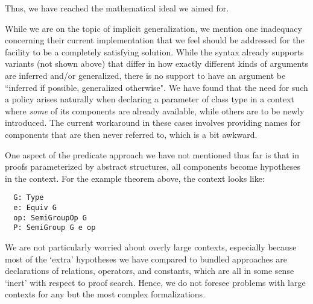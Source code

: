 \documentclass[a4paper,10pt,runningheads]{llncs}
\begin{document}
Thus, we have reached the mathematical ideal we aimed for.

While we are on the topic of implicit generalization, we mention one inadequacy concerning their current implementation that we feel should be addressed for the facility to be a completely satisfying solution. While the syntax already supports variants (not shown above) that differ in how exactly different kinds of arguments are inferred and/or generalized, there is no support to have an argument be ``inferred if possible, generalized otherwise". We have found that the need for such a policy arises naturally when declaring a parameter of class type in a context where \emph{some} of its components are already available, while others are to be newly introduced. The current workaround in these cases involves providing names for components that are then never referred to, which is a bit awkward.







One aspect of the predicate approach we have not mentioned thus far is that in proofs parameterized by abstract structures, all components become hypotheses in the context. For the example theorem above, the context looks like:
\begin{lstlisting}
  G: Type
  e: Equiv G
  op: SemiGroupOp G
  P: SemiGroup G e op
\end{lstlisting}
We are not particularly worried about overly large contexts, especially because most of the `extra' hypotheses we have compared to bundled approaches are declarations of relations, operators, and constants, which are all in some sense `inert' with respect to proof search. Hence, we do not foresee problems with large contexts for any but the most complex formalizations.
\end{document}
